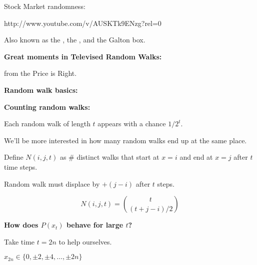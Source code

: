   Stock Market randomness:

  \begin{center}

    {http://www.youtube.com/v/AUSKTk9ENzg?rel=0}

  \end{center}

    Also known as the ,
    the
    ,
    and the Galton box.


  
  
  \textbf{Great moments in Televised Random Walks:}

    from the Price is Right.
  



  \textbf{Random walk basics:}

  \textbf{Counting random walks:}
    
    
      Each  random walk of
      length $t$ appears with a chance $1/2^{t}$.
    
      We'll be more interested in how many random walks
      end up at the same place.
     
      Define
      $
      N(i,j,t)
      $
      as \# distinct walks that start at $x=i$
      and end at $x=j$ after $t$ time steps.
     
      Random walk must displace by $+(j-i)$ after $t$ steps.
    
      $$ 
      N(i,j,t) = \binom{t}{(t+j-i)/2} 
      $$
    
  



  \textbf{How does $P(x_{t})$ behave for large $t$?}
    
    
      Take time $t=2n$ to help ourselves.
    
      $x_{2n} \in \{0, \pm 2, \pm 4, \ldots, \pm 2n\}$
    
